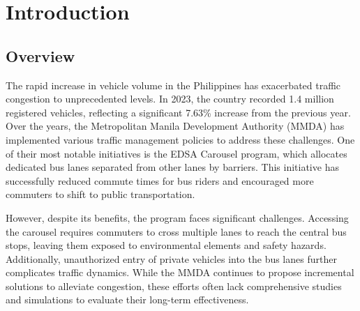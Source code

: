 \section{Introduction}
\subsection{Overview}

The rapid increase in vehicle volume in the Philippines has exacerbated traffic congestion to unprecedented levels. In 2023, the country recorded 1.4 million registered vehicles, reflecting a significant 7.63\% increase from the previous year. Over the years, the Metropolitan Manila Development Authority (MMDA) has implemented various traffic management policies to address these challenges. One of their most notable initiatives is the EDSA Carousel program, which allocates dedicated bus lanes separated from other lanes by barriers. This initiative has successfully reduced commute times for bus riders and encouraged more commuters to shift to public transportation.

However, despite its benefits, the program faces significant challenges. Accessing the carousel requires commuters to cross multiple lanes to reach the central bus stops, leaving them exposed to environmental elements and safety hazards. Additionally, unauthorized entry of private vehicles into the bus lanes further complicates traffic dynamics. While the MMDA continues to propose incremental solutions to alleviate congestion, these efforts often lack comprehensive studies and simulations to evaluate their long-term effectiveness.

